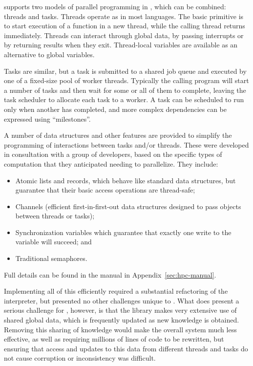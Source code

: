 
\HPCGAP supports two models of parallel programming in \GAP, which can
be combined: threads and tasks. Threads operate as in most languages.
The basic primitive is to start execution of a \GAP function in a new
thread, while the calling thread returns immediately. Threads can
interact through global data, by passing interrupts or by returning
results when they exit. Thread-local variables are available as an
alternative to global variables.

Tasks are
similar, but a task is submitted to a shared job queue and executed by
one of a fixed-size pool of worker threads. Typically the calling
program will start a number of tasks and then wait for some or all
of them to complete, leaving the task scheduler to allocate each task
to a worker. A task can be scheduled to run only when another
has completed, and more complex dependencies can be expressed using
``milestones''.

A number of data structures and other features are provided to
simplify the programming of interactions between tasks and/or
threads. These were developed in consultation with a group of \GAP
developers, based on the specific types of computation that they
anticipated needing to parallelize. They include:
\begin{itemize}
\item Atomic lists and records, which behave like standard \GAP data
    structures, but guarantee that their basic access operations are
    thread-safe;
  \item Channels (efficient first-in-first-out data structures
    designed to pass objects between threads or tasks);
  \item Synchronization variables which guarantee that exactly one
    write to the variable will succeed; and
  \item Traditional semaphores.
\end{itemize}
Full details can be found in the \HPCGAP manual in Appendix~\ref{sec:hpc-manual}.

Implementing all of this efficiently required a substantial
refactoring of the \GAP interpreter, but presented no other challenges
unique to \GAP.  What does present a serious challenge for \HPCGAP, however, is that the \GAP
library makes very extensive use of shared global data, which is
frequently updated as new knowledge is obtained. Removing this sharing
of knowledge would make the overall system much less effective, as
well as requiring millions of lines of code to be rewritten, but
ensuring that access and updates to this data from different threads
and tasks do not cause corruption or inconsistency was difficult.

